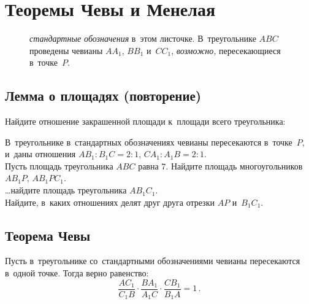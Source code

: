 
\section*{Теоремы Чевы и Менелая}


\begin{figure}[hb]
\begin{center}
    \caption{%
        \emph{стандартные обозначения} в~этом листочке.
        В~треугольнике $ABC$ проведены чевианы $A A_1$, $B B_1$ и~$C C_1$,
        \emph{возможно,} пересекающиеся в~точке~$P$.}
    \label{triangle-area-2:fig:generic-triangle}
\end{center}
\end{figure}

\subsection*{Лемма о площадях (повторение)}

\begin{problems}

\item
Найдите отношение закрашенной площади к~площади всего треугольника:
\begin{center}
\end{center}

\item
В~треугольнике в~стандартных обозначениях чевианы пересекаются в~точке~$P$,
и~даны отношения $A B_1 : B_1 C = 2 : 1$, $C A_1 : A_1 B = 2 : 1$.
\\
\subproblem
Пусть площадь треугольника $ABC$ равна $7$.
Найдите площадь многоугольников $A B_1 P$, $A B_1 P C_1$.
\\
\subproblem
\ldots найдите площадь треугольника $A B_1 C_1$.
\\
\subproblem
Найдите, в~каких отношениях делят друг друга отрезки $AP$ и~$B_1 C_1$.

\end{problems}


\subsection*{Теорема Чевы}

Пусть в~треугольнике со~стандартными обозначениями чевианы пересекаются
в~одной точке.
Тогда верно равенство:
\[
    \frac{A C_1}{C_1 B} \cdot \frac{B A_1}{A_1 C} \cdot \frac{C B_1}{B_1 A}
=
    1
\, . \]

